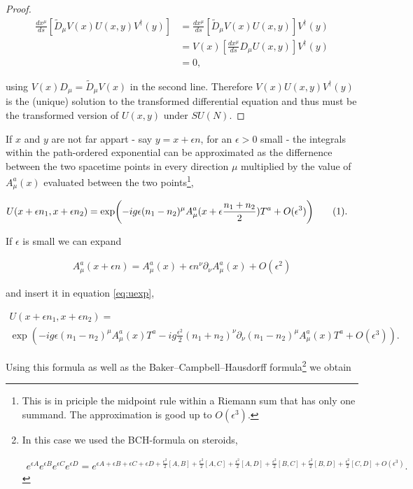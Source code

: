 \documentclass{article}
\newcommand\numberthis{\addtocounter{equation}{1}\tag{\theequation}}
\theoremstyle{plain} %
\theoremstyle{convention} %
\theoremstyle{remark} %
\numberwithin{equation}{section}
\begin{document}
\begin{proof}
\begin{align*}
    \frac{dx^{\mu}}{ds} \left[ \tilde{D}_{\mu} V(x) U(x,y) V^{\dagger}(y) \right] &= \frac{dx^{\mu}}{ds} \left[ \tilde{D}_{\mu} V(x) U(x,y) \right] V^{\dagger}(y) \\
    &= V(x) \left[ \frac{dx^{\mu}}{ds} D_{\mu} U(x,y) \right] V^{\dagger}(y) \\
    &= 0,
\end{align*}

using $V(x) D_{\mu} = \tilde{D}_{\mu} V(x)$ in the second line. Therefore $V(x) U(x,y) V^{\dagger}(y)$ is the (unique) solution to the transformed differential equation and thus must be the transformed version of $U(x,y)$ under $SU(N)$.

\end{proof}

If $x$ and $y$ are not far appart - say $y=x+\epsilon n$, for an $\epsilon>0$ small - the integrals within the path-ordered exponential can be approximated as the differnence between the two spacetime points in every direction $\mu$ multiplied by the value of $A_{\mu}^a(x)$ evaluated between the two points\footnote{This is in priciple the midpoint rule within a Riemann sum that has only one summand. The  approximation is good up to $O(\epsilon^3)$.},

\begin{align*}
    U(x + \epsilon n_1, x + \epsilon n_2) &= \exp(-ig \epsilon (n_1 - n_2)^{\mu} A_{\mu}^a(x + \epsilon \frac{n_1 + n_2}{2} ) T^a +  O(\epsilon^3) ) \numberthis \label{eq:uexp}.
\end{align*}

If $\epsilon$ is small we can expand

\begin{align*}
    A_{\mu}^a(x + \epsilon n) = A_{\mu}^a(x) + \epsilon n^{\nu} \partial_{\nu} A_{\mu}^a(x) + O(\epsilon^2)
\end{align*}

and insert it in equation \eqref{eq:uexp},

\begin{multline*}
    U(x + \epsilon n_1, x + \epsilon n_2) = \\
    \exp(-ig \epsilon (n_1 - n_2)^{\mu} A_{\mu}^a(x) T^a - ig \frac{\epsilon^2}{2} (n_1+n_2)^{\nu} \partial_{\nu} (n_1 - n_2)^{\mu} A_{\mu}^a(x) T^a + O(\epsilon^3) ).
\end{multline*}

Using this formula as well as the Baker–Campbell–Hausdorff formula\footnote{In this case we used the BCH-formula on steroids,

\begin{align*}
  e^{\epsilon A} e^{\epsilon B} e^{\epsilon C} e^{\epsilon D} = e^{\epsilon A + \epsilon B + \epsilon C + \epsilon D + \frac{\epsilon^2}{2} [A,B] + \frac{\epsilon^2}{2} [A,C] + \frac{\epsilon^2}{2} [A,D] + \frac{\epsilon^2}{2} [B,C] + \frac{\epsilon^2}{2} [B,D] + \frac{\epsilon^2}{2} [C,D] + O(\epsilon^3) }.
\end{align*}

} we obtain
\end{document}

